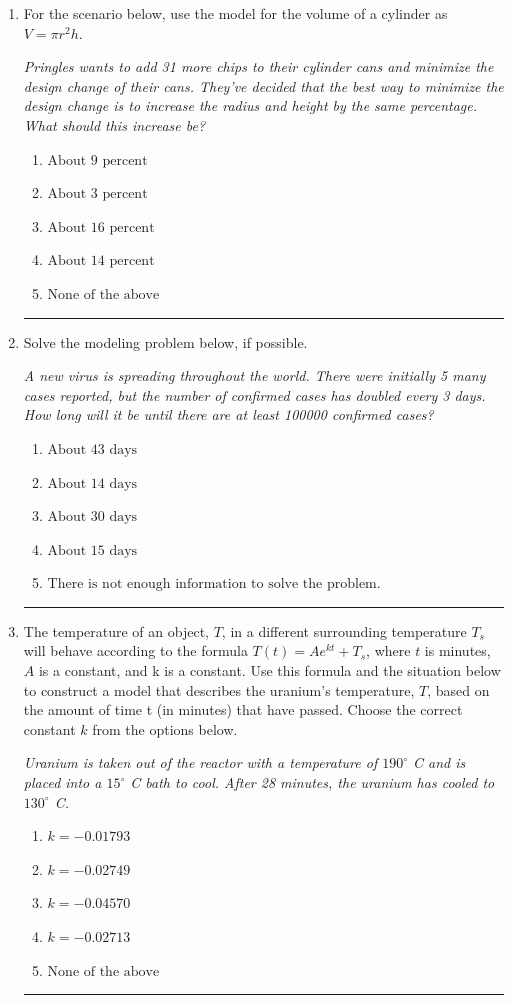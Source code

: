 \documentclass[14pt]{extbook}
\newcommand{\litem}[1]{\item#1\hspace*{-1cm}\rule{\textwidth}{0.4pt}}
\begin{document}
\begin{enumerate}
\litem{
For the scenario below, use the model for the volume of a cylinder as $V = \pi r^2 h$.
\begin{center}
    \textit{ Pringles wants to add 31 \text{percent} more chips to their cylinder cans and minimize the design change of their cans. They've decided that the best way to minimize the design change is to increase the radius and height by the same percentage. What should this increase be? }
\end{center}
\begin{enumerate}[label=\Alph*.]
\item \( \text{About } 9 \text{ percent} \)
\item \( \text{About } 3 \text{ percent} \)
\item \( \text{About } 16 \text{ percent} \)
\item \( \text{About } 14 \text{ percent} \)
\item \( \text{None of the above} \)

\end{enumerate} }
\litem{
Solve the modeling problem below, if possible.
\begin{center}
    \textit{ A new virus is spreading throughout the world. There were initially 5 many cases reported, but the number of confirmed cases has doubled every 3 days. How long will it be until there are at least 100000 confirmed cases? }
\end{center}
\begin{enumerate}[label=\Alph*.]
\item \( \text{About } 43 \text{ days} \)
\item \( \text{About } 14 \text{ days} \)
\item \( \text{About } 30 \text{ days} \)
\item \( \text{About } 15 \text{ days} \)
\item \( \text{There is not enough information to solve the problem.} \)

\end{enumerate} }
\litem{
The temperature of an object, $T$, in a different surrounding temperature $T_s$ will behave according to the formula $T(t) = Ae^{kt} + T_s$, where $t$ is minutes, $A$ is a constant, and k is a constant. Use this formula and the situation below to construct a model that describes the uranium's temperature, $T$, based on the amount of time t (in minutes) that have passed. Choose the correct constant $k$ from the options below.
\begin{center}
    \textit{ Uranium is taken out of the reactor with a temperature of $190^{\circ}$ C and is placed into a $15^{\circ}$ C bath to cool. After 28 minutes, the uranium has cooled to $130^{\circ}$ C. }
\end{center}
\begin{enumerate}[label=\Alph*.]
\item \( k = -0.01793 \)
\item \( k = -0.02749 \)
\item \( k = -0.04570 \)
\item \( k = -0.02713 \)
\item \( \text{None of the above} \)


\end{enumerate}}
\end{enumerate}
\end{document}
